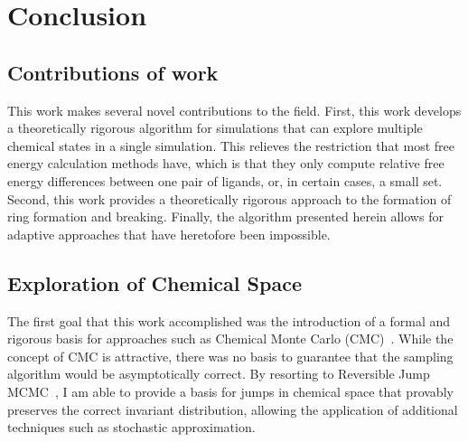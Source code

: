 \chapter{Conclusion}
%
\section{Contributions of work}
%
This work makes several novel contributions to the field.
%
First, this work develops a theoretically rigorous algorithm for simulations that can explore multiple chemical states in a single simulation.
%
This relieves the restriction that most free energy calculation methods have, which is that they only compute relative free energy differences between one pair of ligands, or, in certain cases, a small set.
%
Second, this work provides a theoretically rigorous approach to the formation of ring formation and breaking.
%
Finally, the algorithm presented herein allows for adaptive approaches that have heretofore been impossible.
%
\section{Exploration of Chemical Space}
%
The first goal that this work accomplished was the introduction of a formal and rigorous basis for approaches such as Chemical Monte Carlo (CMC)~\cite{Pitera1998}.
%
While the concept of CMC is attractive, there was no basis to guarantee that the sampling algorithm would be asymptotically correct.
%
By resorting to Reversible Jump MCMC~\cite{GREEN1995}, I am able to provide a basis for jumps in chemical space that provably preserves the correct invariant distribution, allowing the application of additional techniques such as stochastic approximation.
%
